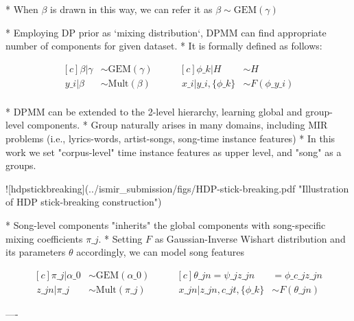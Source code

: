 \documentclass{beamer}
\begin{document}
\begin{frame}[fragile]
\begin{columns}[T]
\begin{column}{.46\textwidth}
\begin{markdown}
* When $\beta$ is drawn in this way, we can refer it as $\beta \sim \text{GEM}(\gamma)$

* Employing DP prior as `mixing distribution`, DPMM can find appropriate number of components for given dataset.
* It is formally defined as follows:

\begin{equation}
\begin{aligned}[c]
    \beta|\gamma &\sim \text{GEM}(\gamma) \\\
    y\_{i}|\beta &\sim \text{Mult}(\beta) \\\
\end{aligned}
\qquad
\begin{aligned}[c]
    \phi\_{k}|H &\sim H \\\
    x\_{i}|y\_{i},\{\phi\_{k}\} &\sim F(\phi\_{y\_{i}}) \\\
\end{aligned}
\end{equation}


* DPMM can be extended to the 2-level hierarchy, learning global and group-level components.
* Group naturally arises in many domains, including MIR problems (i.e., lyrics-words, artist-songs, song-time instance features)
* In this work we set "corpus-level" time instance features as upper level, and "song" as a groups.

\setkeys{Gin}{width=.7\linewidth}
![hdpstickbreaking](../ismir_submission/figs/HDP-stick-breaking.pdf "Illustration of HDP stick-breaking construction")

* Song-level components "inherits" the global components with song-specific mixing coefficients $\pi\_{j}$.
* Setting $F$ as Gaussian-Inverse Wishart distribution and its parameters $\theta$ accordingly, we can model song features 

\begin{equation}
\begin{aligned}[c]
    \pi\_{j}|\alpha\_{0} &\sim \text{GEM}(\alpha\_{0}) \\\
    z\_{jn}|\pi\_{j} &\sim \text{Mult}(\pi\_{j})
\end{aligned}
\qquad
\begin{aligned}[c]
    \theta\_{jn} = \psi\_{jz\_{jn}} &= \phi\_{c\_{jz\_{jn}}}  \\\
    x\_{jn}|z\_{jn}, c\_{jt}, \{\phi\_{k}\} &\sim F(\theta\_{jn}) 
\end{aligned}
\end{equation}

---- 


\end{markdown}
\end{column}
\end{columns}
\end{frame}
\end{document}
